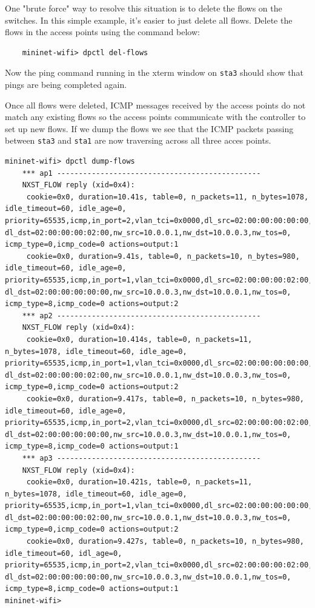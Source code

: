 One "brute force" way to resolve this situation is to delete the flows on the switches. In this simple example, it's easier to just delete all flows. Delete the flows in the access points using the command below: 

\begin{verbatim}
    mininet-wifi> dpctl del-flows
\end{verbatim}
    

Now the ping command running in the xterm window on \texttt{sta3} should show that pings are being completed again.

Once all flows were deleted, ICMP messages received by the access points do not match any existing flows so the access points communicate with the controller to set up new flows. If we dump the flows we see that the ICMP packets passing between \texttt{sta3} and \texttt{sta1} are now traversing across all three acces points.

\begin{verbatim}
mininet-wifi> dpctl dump-flows
    *** ap1 -----------------------------------------------
    NXST_FLOW reply (xid=0x4):
     cookie=0x0, duration=10.41s, table=0, n_packets=11, n_bytes=1078, idle_timeout=60, idle_age=0, priority=65535,icmp,in_port=2,vlan_tci=0x0000,dl_src=02:00:00:00:00:00, dl_dst=02:00:00:00:02:00,nw_src=10.0.0.1,nw_dst=10.0.0.3,nw_tos=0, icmp_type=0,icmp_code=0 actions=output:1
     cookie=0x0, duration=9.41s, table=0, n_packets=10, n_bytes=980, idle_timeout=60, idle_age=0, priority=65535,icmp,in_port=1,vlan_tci=0x0000,dl_src=02:00:00:00:02:00, dl_dst=02:00:00:00:00:00,nw_src=10.0.0.3,nw_dst=10.0.0.1,nw_tos=0, icmp_type=8,icmp_code=0 actions=output:2
    *** ap2 -----------------------------------------------
    NXST_FLOW reply (xid=0x4):
     cookie=0x0, duration=10.414s, table=0, n_packets=11, n_bytes=1078, idle_timeout=60, idle_age=0, priority=65535,icmp,in_port=1,vlan_tci=0x0000,dl_src=02:00:00:00:00:00, dl_dst=02:00:00:00:02:00,nw_src=10.0.0.1,nw_dst=10.0.0.3,nw_tos=0, icmp_type=0,icmp_code=0 actions=output:2
     cookie=0x0, duration=9.417s, table=0, n_packets=10, n_bytes=980, idle_timeout=60, idle_age=0, priority=65535,icmp,in_port=2,vlan_tci=0x0000,dl_src=02:00:00:00:02:00, dl_dst=02:00:00:00:00:00,nw_src=10.0.0.3,nw_dst=10.0.0.1,nw_tos=0, icmp_type=8,icmp_code=0 actions=output:1
    *** ap3 -----------------------------------------------
    NXST_FLOW reply (xid=0x4):
     cookie=0x0, duration=10.421s, table=0, n_packets=11, n_bytes=1078, idle_timeout=60, idle_age=0, priority=65535,icmp,in_port=1,vlan_tci=0x0000,dl_src=02:00:00:00:00:00, dl_dst=02:00:00:00:02:00,nw_src=10.0.0.1,nw_dst=10.0.0.3,nw_tos=0, icmp_type=0,icmp_code=0 actions=output:2
     cookie=0x0, duration=9.427s, table=0, n_packets=10, n_bytes=980, idle_timeout=60, idl_age=0, priority=65535,icmp,in_port=2,vlan_tci=0x0000,dl_src=02:00:00:00:02:00, dl_dst=02:00:00:00:00:00,nw_src=10.0.0.3,nw_dst=10.0.0.1,nw_tos=0, icmp_type=8,icmp_code=0 actions=output:1
mininet-wifi>
\end{verbatim}
    

